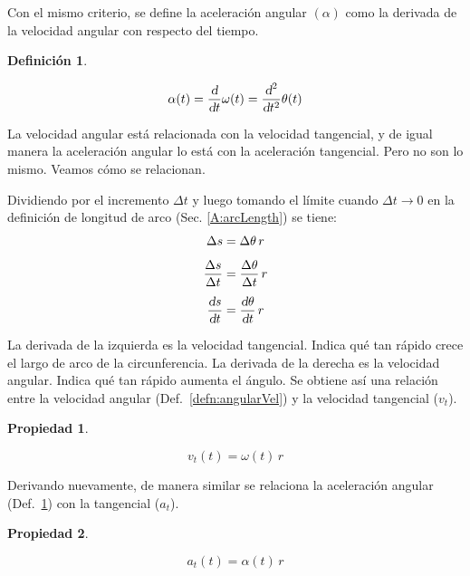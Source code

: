 \documentclass[a5paper,12pt,twoside]{book}
\newtheorem{defn}{{Definición}}[chapter]
\newtheorem{prop}{{Propiedad}}[chapter]
\begin{document}
Con el mismo criterio, se define la aceleración angular $(\alpha)$ como la derivada de la velocidad angular con respecto del tiempo.

\begin{mdframed}[style=MyFrame1]
    \begin{defn}
        \label{defn:angularAccel}
    \end{defn}
    \begin{equation*}
        \alpha (t) = \dfrac{\textsl{d}}{\textsl{d} t} \omega (t) = \dfrac{\textsl{d}^2}{\textsl{d} t^2} \theta (t)
    \end{equation*}
\end{mdframed}

La velocidad angular está relacionada con la velocidad tangencial, y de igual manera la aceleración angular lo está con la aceleración tangencial. Pero no son lo mismo. Veamos cómo se relacionan.

Dividiendo por el incremento $\Delta t$ y luego tomando el límite cuando $\Delta t \to 0$ en la definición de longitud de arco (Sec. \ref{A:arcLength}) se tiene:
\begin{align*}
    \Delta s &= \Delta \theta \, r
    \\[1ex]
    \frac{\Delta s}{\Delta t} &= \frac{\Delta \theta}{\Delta t} \, r
    \\[1ex]
    \frac{\textsl{d} s}{\textsl{d} t} &= \frac{\textsl{d} \theta}{\textsl{d} t} \, r
\end{align*}

La derivada de la izquierda es la velocidad tangencial. Indica qué tan rápido crece el largo de arco de la circunferencia. La derivada de la derecha es la velocidad angular. Indica qué tan rápido aumenta el ángulo. Se obtiene así una relación entre la velocidad angular (Def.\ \ref{defn:angularVel}) y la velocidad tangencial ($v_t$).

\begin{mdframed}[style=MyFrame1]
    \begin{prop}
        \label{prop:circularVel}
    \end{prop}
    \begin{equation*}
        v_t(t) = \omega(t) \, r
    \end{equation*}
\end{mdframed}

Derivando nuevamente, de manera similar se relaciona la aceleración angular (Def.\ \ref{defn:angularAccel}) con la tangencial ($a_t$).

\begin{mdframed}[style=MyFrame1]
    \begin{prop}
        \label{prop:circularAccel}
    \end{prop}
    \begin{equation*}
        a_t(t) = \alpha(t) \, r
    \end{equation*}
\end{mdframed}
\end{document}
